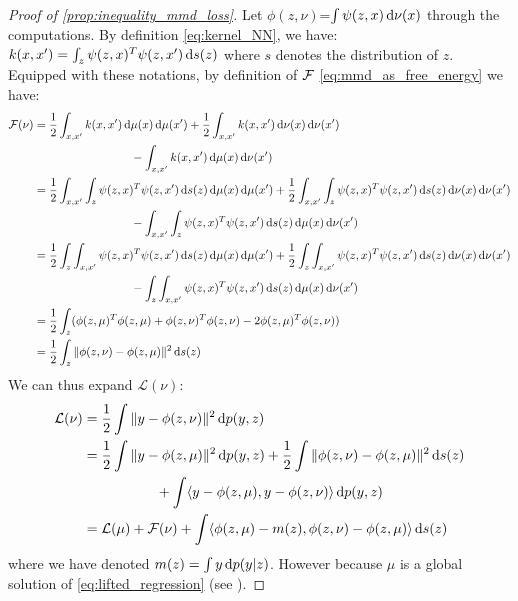 \begin{proof}[Proof of \cref{prop:inequality_mmd_loss}]\label{proof:prop:inequality_mmd_loss}Let $\phi(z,\nu)$=$\int \psi(z,x)\mathop{}\!\mathrm{d} \nu(x)$ through the computations. By definition \eqref{eq:kernel_NN}, we have: $k(x,x') =\int_{z}\psi(z,x)^T\psi(z,x')\mathop{}\!\mathrm{d} s(z)$ where $s$ denotes the distribution of $z$. Equipped with these notations, by definition of ${{\mathcal F}}$ \eqref{eq:mmd_as_free_energy} we have:
	\begin{align*}
	\F(\nu)&=\frac12 \int_{x,x'} k(x,x')\diff \mu(x)\diff\mu(x')+\frac12 \int_{x,x'} k(x,x')\diff \nu(x)\diff\nu(x')\\
	&\phantom{{}=\frac12 \int_{x,x'} k(x,x')\diff}- \int_{x,x'} k(x,x')\diff \mu(x)\diff\nu(x')\\
	&=\frac12 \int_{x,x'} \int_{z}\psi(z,x)^T\psi(z,x')\diff s(z)\diff \mu(x)\diff\mu(x')+\frac12 \int_{x,x'} \int_{z}\psi(z,x)^T\psi(z,x')\diff s(z)\diff \nu(x)\diff\nu(x')\\
	&\phantom{{}=\frac12 \int_{x,x'} k(x,x')\diff} - \int_{x,x'} \int_{z}\psi(z,x)^T\psi(z,x')\diff s(z)\diff \mu(x)\diff\nu(x')\notag\\
	 	&=\frac12  \int_{z}\int_{x,x'}\psi(z,x)^T\psi(z,x')\diff s(z)\diff \mu(x)\diff\mu(x')+\frac12 \int_{z}\int_{x,x'}\psi(z,x)^T\psi(z,x')\diff s(z)\diff \nu(x)\diff\nu(x')\\
	 &\phantom{{}=\frac12 \int_{x,x'} k(x,x')\diff} - \int_{z}\int_{x,x'}\psi(z,x)^T\psi(z,x')\diff s(z)\diff \mu(x)\diff\nu(x')\\
	 &=\frac12 \int_{z}(\phi(z,\mu)^T \phi(z,\mu) + \phi(z,\nu)^T \phi(z,\nu) -2 \phi(z,\mu)^T \phi(z,\nu))\\
	&=\frac12 \int_{z} \Vert \phi(z,\nu)- \phi(z,\mu)\Vert^2\diff s(z)
	\end{align*}
	We can thus expand $\mathcal{L}(\nu)$:
\begin{align*}
 \mathcal{L}(\nu)&=\frac12 \int \Vert y- \phi(z,\nu)\Vert^2 \diff p(y,z)\\
 &=\frac12 \int \Vert y- \phi(z,\mu)\Vert^2\diff p(y,z)+\frac12 \int \Vert \phi(z,\nu)- \phi(z,\mu)\Vert^2 \diff s(z)\\
 &\phantom{{}=\frac12 \int \Vert y- } + \int \ps{y-\phi(z,\mu), y-\phi(z,\nu)}\diff p(y,z)\notag\\
 &=\mathcal{L}(\mu)+ \mathcal{F}(\nu)+ \int \ps{\phi(z,\mu)-m(z),\phi(z,\nu)-\phi(z,\mu)}\diff s(z)
\end{align*}
where we have denoted $m(z)=\int y \mathop{}\!\mathrm{d} p(y|z)$. However because $\mu$ is a global solution of \eqref{eq:lifted_regression} (see \cite{chizat2018global}).

\end{proof}
